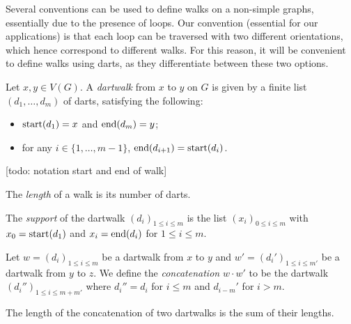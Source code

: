 Several conventions can be used to define walks on a non-simple graphs, essentially
due to the presence of loops. Our convention (essential for our applications)
is that each loop can be traversed with two different orientations, which hence
correspond to different walks. For this reason, it will be convenient to define
walks using darts, as they differentiate between these two options.

\begin{definition}
  \label{def:dartwalk}
  \leanok
  Let $x, y \in V(G)$. A \emph{dartwalk} from $x$ to $y$ on $G$ is given by a finite list
  $(d_1, \ldots, d_m)$ of darts, satisfying the following:
    \begin{itemize}
      \item $\mathrm{start}(d_1)=x$ and $\mathrm{end}(d_m)=y$;
      \item for any $i \in \{1, \ldots, m-1\}$, $\mathrm{end}(d_{i+1}) = \mathrm{start}(d_i)$.
    \end{itemize}
\end{definition}

[todo: notation start and end of walk]

\begin{definition}
  \label{def:length}
  \leanok
  The \emph{length} of a walk is its number of darts.
\end{definition}

\begin{definition}
  \label{def:dartwalk_support}
  \leanok
  The \emph{support} of the dartwalk $(d_i)_{1 \leq i \leq m}$
  is the list $(x_i)_{0 \leq i \leq m}$ with $x_0=\mathrm{start}(d_1)$ and
  $x_i = \mathrm{end}(d_i)$ for $1 \leq i \leq m$.
\end{definition}

\begin{definition}
  \label{def:concatenation}
  Let $w = (d_i)_{1 \leq i \leq m}$ be a dartwalk from $x$ to $y$
  and $w' = (d_i')_{1 \leq i \leq m'}$ be a dartwalk from $y$ to $z$.
  We define the \emph{concatenation} $w \cdot w'$ to be the dartwalk $(d_i'')_{1 \leq i \leq m+m'}$
  where $d_i''=d_i$ for $i \leq m$ and $d_{i-m}'$ for $i > m$.
\end{definition}

\begin{lemma}
  \label{lem:length_concat}
  The length of the concatenation of two dartwalks is the sum of their lengths.
\end{lemma}

